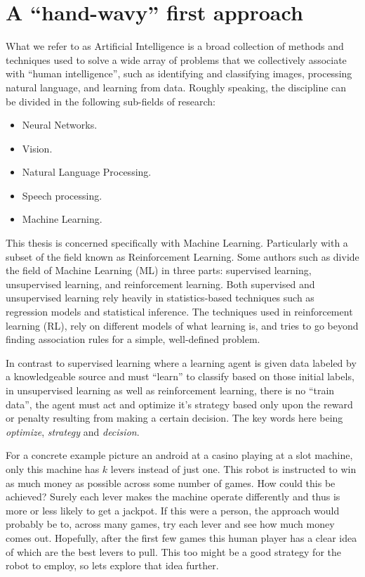 \section{A ``hand-wavy'' first approach}

What we refer to as Artificial Intelligence is a broad 
collection of methods and techniques used to solve a wide array 
of problems that we collectively associate with ``human 
intelligence'', such as identifying and classifying images, 
processing natural language, and learning from data.  Roughly 
speaking, the discipline can be divided in the following 
sub-fields of research:

\begin{itemize}
	\item Neural Networks.
	\item Vision.
	\item Natural Language Processing.
	\item Speech processing.
	\item Machine Learning.
\end{itemize}

This thesis is concerned specifically with Machine Learning.  
Particularly with a subset of the field known as Reinforcement 
Learning. Some authors such as \cite{SuttonBarto} divide the 
field of Machine Learning (ML) in three parts: supervised 
learning, unsupervised learning, and reinforcement learning.  
Both supervised and unsupervised learning rely heavily in 
statistics-based techniques such as regression models and 
statistical inference. The techniques used in reinforcement 
learning (RL), rely on different models of what learning is, and 
tries to go beyond finding association rules for a simple, 
well-defined problem.

In contrast to supervised learning where a learning agent is 
given data labeled by a knowledgeable source and must ``learn'' 
to classify based on those initial labels, in unsupervised 
learning as well as reinforcement learning, there is no ``train 
data'', the agent must act and optimize it's strategy based only 
upon the reward or penalty resulting from making a certain 
decision.  The key words here being \textit{optimize}, 
\textit{strategy} and \textit{decision}.

For a concrete example picture an android at a casino playing at 
a slot machine, only this machine has $k$ levers instead of just 
one.  This robot is instructed to win as much money as possible 
across some number of games. How could this be achieved? Surely 
each lever makes the machine operate differently and thus is 
more or less likely to get a jackpot. If this were a person, the 
approach would probably be to, across many games, try each lever 
and see how much money comes out. Hopefully, after the first few 
games this human player has a clear idea of which are the best 
levers to pull. This too might be a good strategy for the robot 
to employ, so lets explore that idea further.

